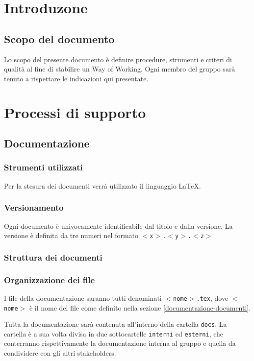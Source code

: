 \documentclass[a4paper,12pt]{article}
\begin{document}
\section{Introduzone}
\subsection{Scopo del documento}
Lo scopo del presente documento è definire procedure, strumenti e criteri di qualità al fine di stabilire un Way of Working. Ogni membro del gruppo sarà tenuto a rispettare le indicazioni qui presentate.

\section{Processi di supporto}

\subsection{Documentazione}

\subsubsection{Strumenti utilizzati}
Per la stesura dei documenti verrà utilizzato il linguaggio \LaTeX.

\subsubsection{Versionamento}
Ogni documento è univocamente identificabile dal titolo e dalla versione. La versione è definita da tre numeri nel formato \texttt{$<$x$>$.$<$y$>$.$<$z$>$}

\subsubsection{Struttura dei documenti}

\subsubsection{Organizzazione dei file}
I file della documentazione saranno tutti denominati \texttt{$<$nome$>$.tex}, dove \texttt{$<$nome$>$} è il nome del file come definito nella sezione \ref{documentazione-documenti}.

Tutta la documentazione sarà contenuta all'interno della cartella \texttt{docs}. La cartella è a sua volta divisa in due sottocartelle \texttt{interni} ed \texttt{esterni}, che conterranno rispettivamente la documentazione interna al gruppo e quella da condividere con gli altri stakeholders.
\end{document}
